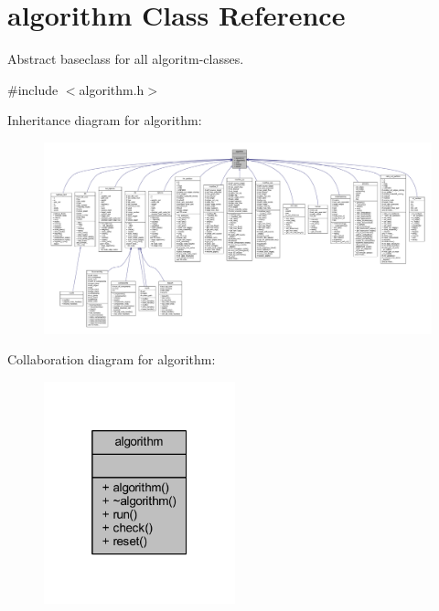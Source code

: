 \hypertarget{classalgorithm}{}\section{algorithm Class Reference}
\label{classalgorithm}


Abstract baseclass for all algoritm-\/classes.  




{\ttfamily \#include $<$algorithm.\+h$>$}



Inheritance diagram for algorithm\+:\nopagebreak
\begin{figure}[H]
\begin{center}
\leavevmode
\includegraphics[width=350pt]{classalgorithm__inherit__graph}
\end{center}
\end{figure}


Collaboration diagram for algorithm\+:\nopagebreak
\begin{figure}[H]
\begin{center}
\leavevmode
\includegraphics[width=157pt]{classalgorithm__coll__graph}
\end{center}
\end{figure}
